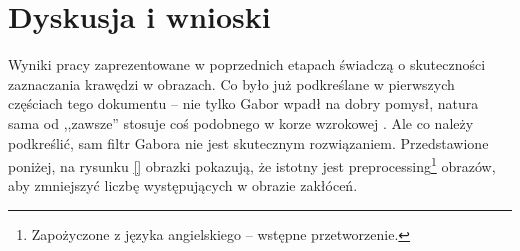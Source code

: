 \section{Dyskusja i wnioski}
\label{aGabor_dyskusja}

Wyniki pracy zaprezentowane w poprzednich etapach świadczą o skuteczności zaznaczania krawędzi w obrazach. Co było już podkreślane w pierwszych częściach tego dokumentu -- nie tylko Gabor wpadł na dobry pomysł, natura sama od ,,zawsze'' stosuje coś podobnego w korze wzrokowej \cite{Jones1987}. Ale co należy podkreślić, sam filtr Gabora nie jest skutecznym rozwiązaniem. Przedstawione poniżej, na rysunku \ref{} obrazki pokazują, że istotny jest preprocessing\footnote{Zapożyczone z języka angielskiego -- wstępne przetworzenie.} obrazów, aby zmniejszyć liczbę występujących w obrazie zakłóceń. 

